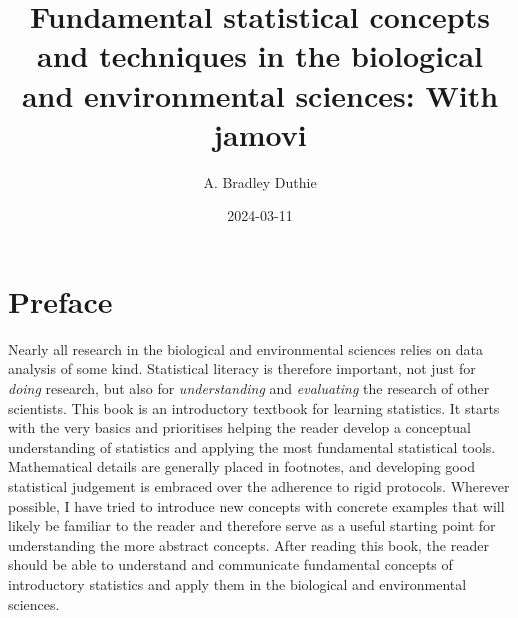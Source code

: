 \documentclass[
  openany]{krantz}
\title{Fundamental statistical concepts and techniques in the biological and environmental sciences: With jamovi}
\author{A. Bradley Duthie}
\date{2024-03-11}
\begin{document}
\maketitle


\thispagestyle{empty}

\begin{center}

\end{center}

\setlength{\abovedisplayskip}{-5pt}
\setlength{\abovedisplayshortskip}{-5pt}

{
\hypersetup{linkcolor=}
\setcounter{tocdepth}{1}
\tableofcontents
}
\hypertarget{preface}{%
\chapter*{Preface}\label{preface}}


Nearly all research in the biological and environmental sciences relies on data analysis of some kind.
Statistical literacy is therefore important, not just for \emph{doing} research, but also for \emph{understanding} and \emph{evaluating} the research of other scientists.
This book is an introductory textbook for learning statistics.
It starts with the very basics and prioritises helping the reader develop a conceptual understanding of statistics and applying the most fundamental statistical tools.
Mathematical details are generally placed in footnotes, and developing good statistical judgement is embraced over the adherence to rigid protocols.
Wherever possible, I have tried to introduce new concepts with concrete examples that will likely be familiar to the reader and therefore serve as a useful starting point for understanding the more abstract concepts.
After reading this book, the reader should be able to understand and communicate fundamental concepts of introductory statistics and apply them in the biological and environmental sciences.
\end{document}
